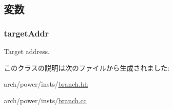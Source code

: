 \subsection{変数}
\hypertarget{classPowerISA_1_1BranchNonPCRelCond_af2e4ceec51be67b8f833e5e205e11ca7}{
\subsubsection[{targetAddr}]{ {\bf targetAddr}}}
\label{classPowerISA_1_1BranchNonPCRelCond_af2e4ceec51be67b8f833e5e205e11ca7}


Target address. 

このクラスの説明は次のファイルから生成されました:\begin{DoxyCompactItemize}
\item 
arch/power/insts/\hyperlink{power_2insts_2branch_8hh}{branch.hh}\item 
arch/power/insts/\hyperlink{branch_8cc}{branch.cc}\end{DoxyCompactItemize}
